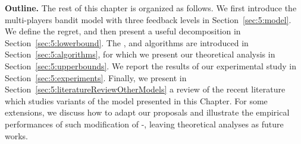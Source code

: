 


\textbf{Outline.}
%
The rest of this chapter is organized as follows.
We first introduce the multi-players bandit model with three feedback levels in Section~\ref{sec:5:model}.
We define the regret, and then present a useful decomposition in Section~\ref{sec:5:lowerbound}.
The \Selfish, \RandTopM{} and \MCTopM{} algorithms are introduced in Section~\ref{sec:5:algorithms},
for which we present our theoretical analysis in Section~\ref{sec:5:upperbounds}.
We report the results of our experimental study in Section~\ref{sec:5:experiments}.
Finally, we present in Section~\ref{sec:5:literatureReviewOtherModels} a review of the recent literature which studies variants of the model presented in this Chapter.
For some extensions, we discuss how to adapt our proposals and illustrate the empirical performances of such modification of \MCTopM-\klUCB{}, leaving theoretical analyses as future works.


